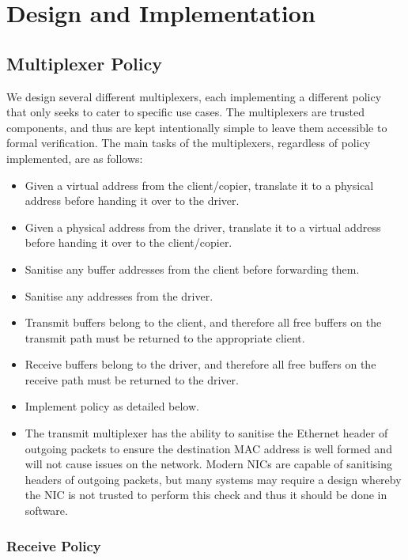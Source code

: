 \chapter{Design and Implementation}\label{ch:design}

\section{Multiplexer Policy}

We design several different multiplexers, each implementing a different policy
that only seeks to cater to specific use cases. The multiplexers are trusted components,
and thus are kept intentionally simple to leave them accessible to formal verification.
The main tasks of the multiplexers, regardless of policy implemented, are as follows:

\begin{itemize}
    \item Given a virtual address from the client/copier, translate it to a physical address before
            handing it over to the driver.
    \item Given a physical address from the driver, translate it to a virtual address before
            handing it over to the client/copier.
    \item Sanitise any buffer addresses from the client before forwarding them.
    \item Sanitise any addresses from the driver. 
    \item Transmit buffers belong to the client, and therefore all free buffers on the transmit path
            must be returned to the appropriate client.
    \item Receive buffers belong to the driver, and therefore all free buffers on the receive path
            must be returned to the driver.
    \item Implement policy as detailed below.
    \item The transmit multiplexer has the ability to sanitise the Ethernet header of outgoing packets
          to ensure the destination MAC address is well formed and will not cause issues
          on the network. Modern NICs are capable of sanitising headers of outgoing packets,
          but many systems may require a design whereby the NIC is not trusted to perform this check 
          and thus it should be done in software.
\end{itemize}

\subsection{Receive Policy}\label{s:rx_policy}

